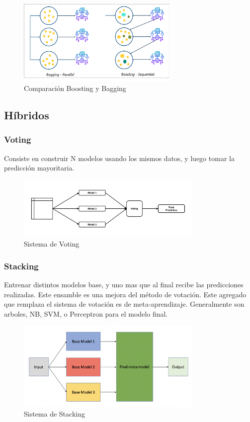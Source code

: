 \documentclass[titlepage,a4paper]{article}
\begin{document}
\begin{figure}[!htb]
    \centering
    \includegraphics[width=0.7\textwidth]{imagenesResumen/Boosting.png}
    \caption{Comparación Boosting y Bagging}
\end{figure}

\subsection{Híbridos}
\subsubsection{Voting}
Consiste en construir N modelos usando los mismos datos, y luego tomar la predicción mayoritaria.

\begin{figure}[!htb]
    \centering
    \includegraphics[width=0.8\textwidth]{imagenesResumen/Voting.png}
    \caption{Sistema de Voting}
\end{figure}

\newpage

\subsubsection{Stacking}
Entrenar distintos modelos base, y uno mas que al final recibe las predicciones realizadas. Este ensamble es una mejora del método de votación. Este agregado que remplaza el sistema de votación es de meta-aprendizaje. Generalmente son arboles, NB, SVM, o Perceptron para el modelo final.

\begin{figure}[!htb]
    \centering
    \includegraphics[width=0.8\textwidth]{imagenesResumen/Stacking.png}
    \caption{Sistema de Stacking}
\end{figure}
\end{document}
